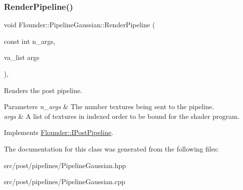 \mbox{\label{class_flounder_1_1_pipeline_gaussian_a5187cbc15a4a56cef0ca227628a0f83f}} 
\subsubsection{\texorpdfstring{Render\+Pipeline()}{RenderPipeline()}}
{\footnotesize\ttfamily void Flounder\+::\+Pipeline\+Gaussian\+::\+Render\+Pipeline (\begin{DoxyParamCaption}\item[{const int}]{n\+\_\+args,  }\item[{va\+\_\+list}]{args }\end{DoxyParamCaption})\hspace{0.3cm}{\ttfamily [override]}, {\ttfamily [virtual]}}



Renders the post pipeline. 


\begin{DoxyParams}{Parameters}
{\em n\+\_\+args} & The number textures being sent to the pipeline. \\
\hline
{\em args} & A list of textures in indexed order to be bound for the shader program. \\
\hline
\end{DoxyParams}


Implements \hyperlink{class_flounder_1_1_i_post_pipeline_ad5388fe41486385c55896bdd9439bf60}{Flounder\+::\+I\+Post\+Pipeline}.



The documentation for this class was generated from the following files\+:\begin{DoxyCompactItemize}
\item 
src/post/pipelines/Pipeline\+Gaussian.\+hpp\item 
src/post/pipelines/Pipeline\+Gaussian.\+cpp\end{DoxyCompactItemize}
